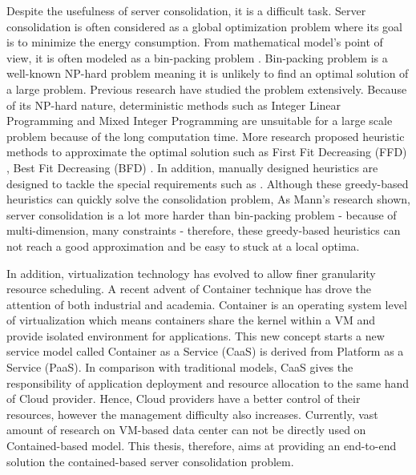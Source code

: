 Despite the usefulness of server consolidation, it is a difficult task. 
Server consolidation is often considered as a global optimization problem 
where its goal is to minimize the energy consumption. 
From mathematical model's point of view, it is often modeled as a bin-packing problem \cite{Mann:2015ua}.
Bin-packing problem is a well-known NP-hard problem meaning it is unlikely to find an optimal solution 
of a large problem. Previous research have studied the problem extensively. 
Because of its NP-hard nature, deterministic methods such as  
Integer Linear Programming \cite{Speitkamp:2010ck} and Mixed
Integer Programming \cite{Wang:2016eh} are unsuitable for a large scale problem 
because of the long computation time.  More research proposed heuristic methods
 to approximate the optimal solution such as 
First Fit Decreasing (FFD) \cite{Panigrahy:2011wk}, Best Fit Decreasing (BFD) \cite{Xu:2010vh}.
In addition, manually designed heuristics are designed to tackle the special requirements such 
as \cite{Li:2009wf, Gupta:2008ul, Jung:2008vb}. Although these greedy-based heuristics can quickly solve the consolidation problem,  As Mann's research \cite{Mann:2015ua} shown, 
server consolidation is a lot more harder than bin-packing problem - because of multi-dimension, many constraints - 
therefore, these greedy-based heuristics can not reach a good approximation and be easy to 
stuck at a local optima.

In addition, virtualization technology has evolved to allow finer granularity resource scheduling.
A recent advent of Container technique \cite{Soltesz:2007ty} has drove the attention of both industrial and academia.
Container is an operating system level of virtualization which means containers share the kernel within a VM and provide isolated environment for applications.
This new concept starts a new service model called Container as a Service (CaaS) \cite{Piraghaj:2015uf} is derived from Platform as a Service (PaaS). 
In comparison with traditional models, CaaS gives the responsibility of application deployment and resource allocation to the same hand of Cloud provider.
Hence, Cloud providers have a better control of their resources, however the management difficulty also increases. 
Currently, vast amount of research on VM-based data center can not be directly used on Contained-based model.
This thesis, therefore, aims at providing an end-to-end solution the contained-based server consolidation problem.




